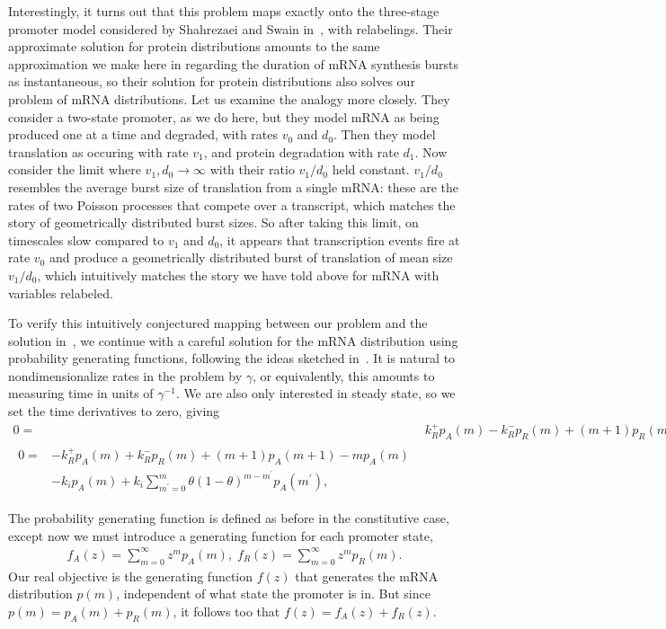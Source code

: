 Interestingly, it turns out that this problem maps exactly onto the
three-stage promoter model considered by
Shahrezaei and Swain in~\cite{Shahrezaei2008}, with relabelings.
Their approximate solution for protein distributions amounts to
the same approximation we make here in regarding the duration
of mRNA synthesis bursts as instantaneous, so their solution
for protein distributions also solves our problem of mRNA distributions.
Let us examine the analogy more closely.
They consider a two-state promoter, as we do here, but they model
mRNA as being produced one at a time and degraded, with rates
$v_0$ and $d_0$.
Then they model translation as occuring with rate $v_1$,
and protein degradation with rate $d_1$.
Now consider the limit where $v_1, d_0\rightarrow\infty$ with
their ratio $v_1/d_0$ held constant.
$v_1/d_0$ resembles the average burst size of translation from a single
mRNA: these are the rates of two Poisson processes that compete over a
transcript, which matches the story of geometrically distributed burst sizes.
So after taking this limit, on timescales slow compared to $v_1$ and $d_0$,
it appears that transcription events fire at rate $v_0$ and produce a
geometrically distributed burst of translation of mean size $v_1/d_0$,
which intuitively matches the story we have told above for mRNA
with variables relabeled.

To verify this intuitively conjectured mapping between our problem and
the solution in~\cite{Shahrezaei2008}, we continue with a careful
solution for the mRNA distribution using probability generating functions,
following the ideas sketched in~\cite{Shahrezaei2008}.
It is natural to nondimensionalize rates in the problem by $\gamma$,
or equivalently, this amounts to measuring time in units of $\gamma^{-1}$.
We are also only interested in steady state, so we set the time
derivatives to zero, giving
\begin{align}
0 =& k_R^+ p_A(m) - k_R^- p_R(m) + (m+1) p_R(m+1) - m p_R(m)
\\
\begin{split}
0 =& - k_R^+ p_A(m) + k_R^- p_R(m) + (m+1) p_A(m+1) - m p_A(m) 
\\
&- k_i p_A(m) + k_i \sum_{m^\prime=0}^m \theta(1-\theta)^{m-m^\prime} p_A(m^\prime),
\end{split}
\end{align}
        
The probability generating function is defined as before in the
constitutive case, except now we must introduce a generating function
for each promoter state,
\begin{align}
f_A(z) = \sum_{m=0}^\infty z^m p_A(m),
\;
f_R(z) = \sum_{m=0}^\infty z^m p_R(m).
\end{align}
Our real objective is the generating function $f(z)$ that generates
the mRNA distribution $p(m)$, independent of what state the promoter is in.
But since $p(m) = p_A(m) + p_R(m)$, it follows too that $f(z) = f_A(z) + f_R(z)$.

